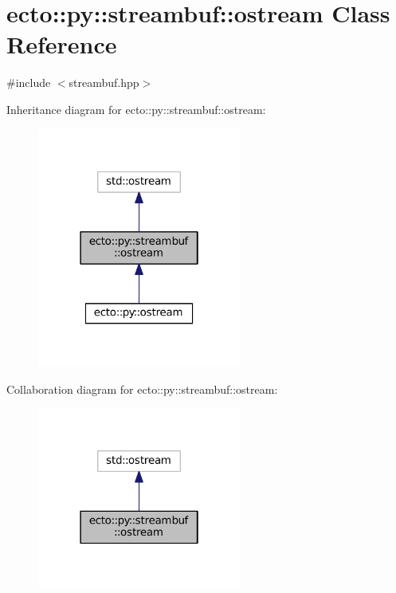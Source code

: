 \hypertarget{classecto_1_1py_1_1streambuf_1_1ostream}{\section{ecto\-:\-:py\-:\-:streambuf\-:\-:ostream Class Reference}
\label{classecto_1_1py_1_1streambuf_1_1ostream}
}


{\ttfamily \#include $<$streambuf.\-hpp$>$}



Inheritance diagram for ecto\-:\-:py\-:\-:streambuf\-:\-:ostream\-:\nopagebreak
\begin{figure}[H]
\begin{center}
\leavevmode
\includegraphics[width=190pt]{classecto_1_1py_1_1streambuf_1_1ostream__inherit__graph}
\end{center}
\end{figure}


Collaboration diagram for ecto\-:\-:py\-:\-:streambuf\-:\-:ostream\-:\nopagebreak
\begin{figure}[H]
\begin{center}
\leavevmode
\includegraphics[width=190pt]{classecto_1_1py_1_1streambuf_1_1ostream__coll__graph}
\end{center}
\end{figure}
